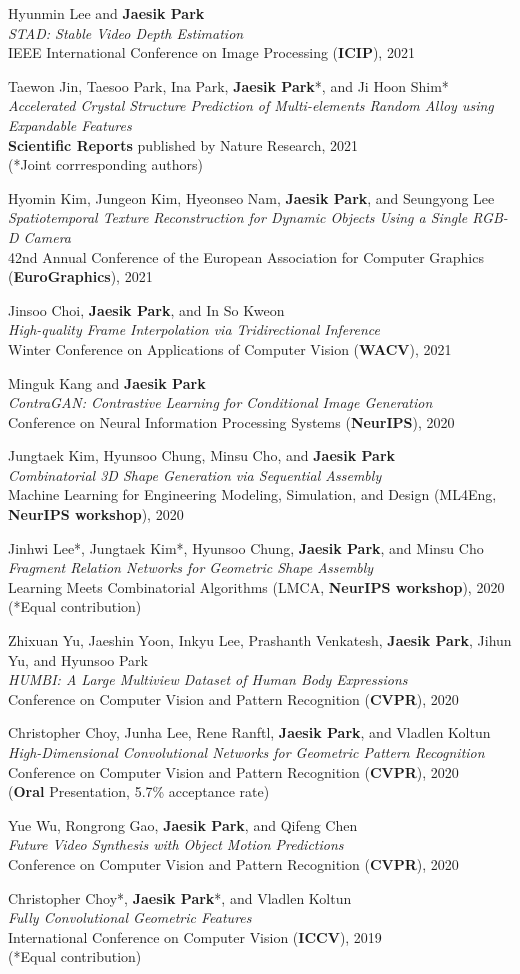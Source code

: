 \documentclass[letterpaper,11pt]{article}
\newcommand{\publicationItem}[4]{
  \small{
  \item{#1\\ \emph{#2}\\ #3\\ #4}
  }
}
\begin{document}
    \publicationItem{Hyunmin Lee and \textbf{Jaesik Park}}{STAD: Stable Video Depth Estimation}{IEEE International Conference on Image Processing (\textbf{ICIP}), 2021}{}
    \publicationItem{Taewon Jin, Taesoo Park, Ina Park, \textbf{Jaesik Park}*, and Ji Hoon Shim*}{Accelerated Crystal Structure Prediction of Multi-elements Random Alloy using Expandable Features}{\textbf{Scientific Reports} published by Nature Research, 2021}{(*Joint corrresponding authors)}
    \publicationItem{Hyomin Kim, Jungeon Kim, Hyeonseo Nam, \textbf{Jaesik Park}, and Seungyong Lee}{Spatiotemporal Texture Reconstruction for Dynamic Objects Using a Single RGB-D Camera}{42nd Annual Conference of the European Association for Computer Graphics (\textbf{EuroGraphics}), 2021}{}
    \publicationItem{Jinsoo Choi, \textbf{Jaesik Park}, and In So Kweon}{High-quality Frame Interpolation via Tridirectional Inference}{Winter Conference on Applications of Computer Vision (\textbf{WACV}), 2021}{}
    \publicationItem{Minguk Kang and \textbf{Jaesik Park}}{ContraGAN: Contrastive Learning for Conditional Image Generation}{Conference on Neural Information Processing Systems (\textbf{NeurIPS}), 2020}{}
    \publicationItem{Jungtaek Kim, Hyunsoo Chung, Minsu Cho, and \textbf{Jaesik Park}}{Combinatorial 3D Shape Generation via Sequential Assembly}{Machine Learning for Engineering Modeling, Simulation, and Design (ML4Eng, \textbf{NeurIPS workshop}), 2020}{}
    \publicationItem{Jinhwi Lee*, Jungtaek Kim*, Hyunsoo Chung, \textbf{Jaesik Park}, and Minsu Cho}{Fragment Relation Networks for Geometric Shape Assembly}{Learning Meets Combinatorial Algorithms (LMCA, \textbf{NeurIPS workshop}), 2020}{(*Equal contribution)}
    \publicationItem{Zhixuan Yu, Jaeshin Yoon, Inkyu Lee, Prashanth Venkatesh, \textbf{Jaesik Park}, Jihun Yu, and Hyunsoo Park}{HUMBI: A Large Multiview Dataset of Human Body Expressions}{Conference on Computer Vision and Pattern Recognition (\textbf{CVPR}), 2020}{}
    \publicationItem{Christopher Choy, Junha Lee, Rene Ranftl, \textbf{Jaesik Park}, and Vladlen Koltun}{High-Dimensional Convolutional Networks for Geometric Pattern Recognition}{Conference on Computer Vision and Pattern Recognition (\textbf{CVPR}), 2020}{(\textbf{Oral} Presentation, 5.7\% acceptance rate)}
    \publicationItem{Yue Wu, Rongrong Gao, \textbf{Jaesik Park}, and Qifeng Chen}{Future Video Synthesis with Object Motion Predictions}{Conference on Computer Vision and Pattern Recognition (\textbf{CVPR}), 2020}{}
    \publicationItem{Christopher Choy*, \textbf{Jaesik Park}*, and Vladlen Koltun}{Fully Convolutional Geometric Features}{International Conference on Computer Vision (\textbf{ICCV}), 2019}{(*Equal contribution)}
\end{document}
